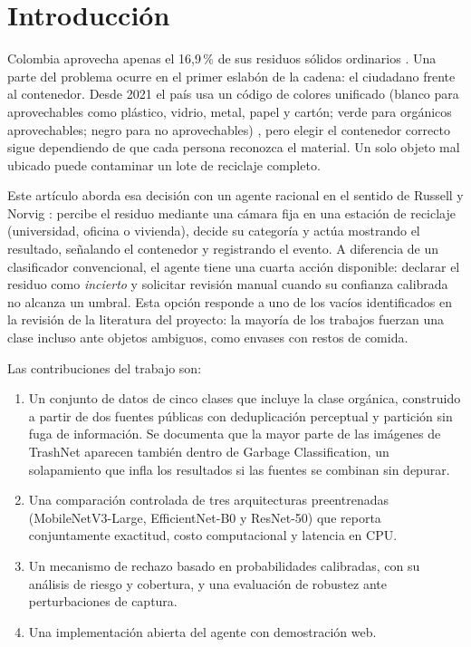 \documentclass[conference,a4paper]{IEEEtran}
\begin{document}
\section{Introducción}
Colombia aprovecha apenas el 16,9\,\% de sus residuos sólidos ordinarios \cite{dnp2025}. Una parte del problema ocurre en el primer eslabón de la cadena: el ciudadano frente al contenedor. Desde 2021 el país usa un código de colores unificado (blanco para aprovechables como plástico, vidrio, metal, papel y cartón; verde para orgánicos aprovechables; negro para no aprovechables) \cite{res2184}, pero elegir el contenedor correcto sigue dependiendo de que cada persona reconozca el material. Un solo objeto mal ubicado puede contaminar un lote de reciclaje completo.

Este artículo aborda esa decisión con un agente racional en el sentido de Russell y Norvig \cite{russell2021}: percibe el residuo mediante una cámara fija en una estación de reciclaje (universidad, oficina o vivienda), decide su categoría y actúa mostrando el resultado, señalando el contenedor y registrando el evento. A diferencia de un clasificador convencional, el agente tiene una cuarta acción disponible: declarar el residuo como \emph{incierto} y solicitar revisión manual cuando su confianza calibrada no alcanza un umbral. Esta opción responde a uno de los vacíos identificados en la revisión de la literatura del proyecto: la mayoría de los trabajos fuerzan una clase incluso ante objetos ambiguos, como envases con restos de comida.

Las contribuciones del trabajo son:
\begin{enumerate}
\item Un conjunto de datos de cinco clases que incluye la clase orgánica, construido a partir de dos fuentes públicas con deduplicación perceptual y partición sin fuga de información. Se documenta que la mayor parte de las imágenes de TrashNet aparecen también dentro de Garbage Classification, un solapamiento que infla los resultados si las fuentes se combinan sin depurar.
\item Una comparación controlada de tres arquitecturas preentrenadas (MobileNetV3-Large, EfficientNet-B0 y ResNet-50) que reporta conjuntamente exactitud, costo computacional y latencia en CPU.
\item Un mecanismo de rechazo basado en probabilidades calibradas, con su análisis de riesgo y cobertura, y una evaluación de robustez ante perturbaciones de captura.
\item Una implementación abierta del agente con demostración web.
\end{enumerate}
\end{document}
